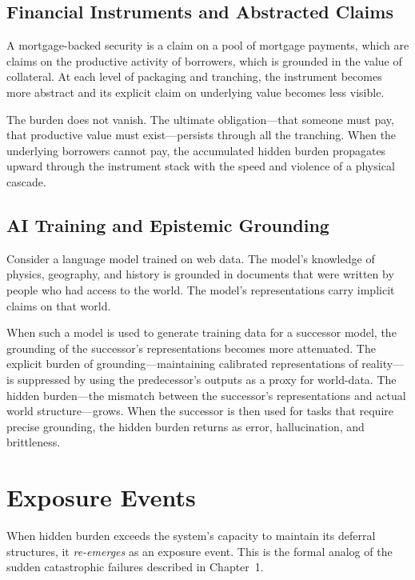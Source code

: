 \documentclass[12pt,a4paper,openany]{book}
\theoremstyle{plain}
\theoremstyle{definition}
\theoremstyle{remark}
\begin{document}
\subsection{Financial Instruments and Abstracted Claims}

A mortgage-backed security is a claim on a pool of mortgage payments, which are claims on the productive activity of borrowers, which is grounded in the value of collateral. At each level of packaging and tranching, the instrument becomes more abstract and its explicit claim on underlying value becomes less visible.

The burden does not vanish. The ultimate obligation---that someone must pay, that productive value must exist---persists through all the tranching. When the underlying borrowers cannot pay, the accumulated hidden burden propagates upward through the instrument stack with the speed and violence of a physical cascade.

\subsection{AI Training and Epistemic Grounding}

Consider a language model trained on web data. The model's knowledge of physics, geography, and history is grounded in documents that were written by people who had access to the world. The model's representations carry implicit claims on that world.

When such a model is used to generate training data for a successor model, the grounding of the successor's representations becomes more attenuated. The explicit burden of grounding---maintaining calibrated representations of reality---is suppressed by using the predecessor's outputs as a proxy for world-data. The hidden burden---the mismatch between the successor's representations and actual world structure---grows. When the successor is then used for tasks that require precise grounding, the hidden burden returns as error, hallucination, and brittleness.

\section{Exposure Events}

When hidden burden exceeds the system's capacity to maintain its deferral structures, it \emph{re-emerges} as an exposure event. This is the formal analog of the sudden catastrophic failures described in Chapter~1.
\end{document}
